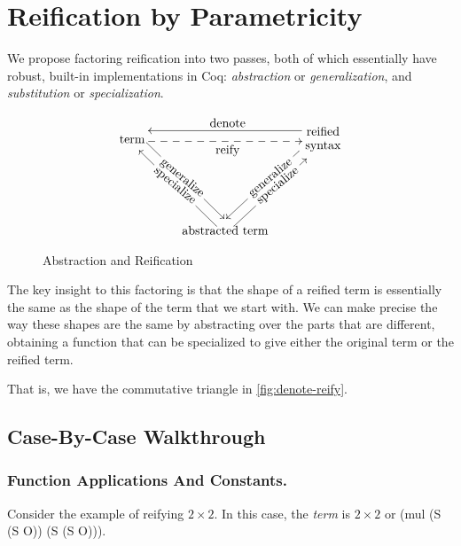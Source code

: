 \section{Reification by Parametricity}\label{sec:reification-by-parametricity}

We propose factoring reification into two passes, both of which essentially have robust, built-in implementations in Coq: \emph{abstraction} or \emph{generalization}, and \emph{substitution} or \emph{specialization}.


\begin{figure}
    \[
    \xymatrix{
        \txt{term}
        \ar@<1ex>[ddr]|{\txt{\rotatebox{-40}{generalize}}}
        \ar@<-1ex>@{-->}[rr]_{\txt{reify}}
        &&
        \txt{reified \\ syntax}
        \ar@<-1ex>[ll]_{\txt{denote}}
        \ar@<-1ex>[ddl]|{\txt{\rotatebox{40}{generalize}}}
        \\ \\
        &
        \txt{abstracted term}
        \ar@<1ex>[uul]|{\txt{\rotatebox{-40}{specialize}}}
        \ar@<-1ex>[uur]|{\txt{\rotatebox{40}{specialize}}}
    }
    \]
    \caption{Abstraction and Reification}\label{fig:denote-reify}
\end{figure}

The key insight to this factoring is that the shape of a reified term is essentially the same as the shape of the term that we start with.
We can make precise the way these shapes are the same by abstracting over the parts that are different, obtaining a function that can be specialized to give either the original term or the reified term.

That is, we have the commutative triangle in \autoref{fig:denote-reify}.

\subsection{Case-By-Case Walkthrough} \label{sec:case-by-case-walkthrough}
\subsubsection{Function Applications And Constants.} \label{sec:reification-by-parametricity-diagram}\label{sec:walkthrough-func-const}
Consider the example of reifying $2\times 2$.
In this case, the \emph{term} is $2 \times 2$ or (mul (S (S O)) (S (S O))).

